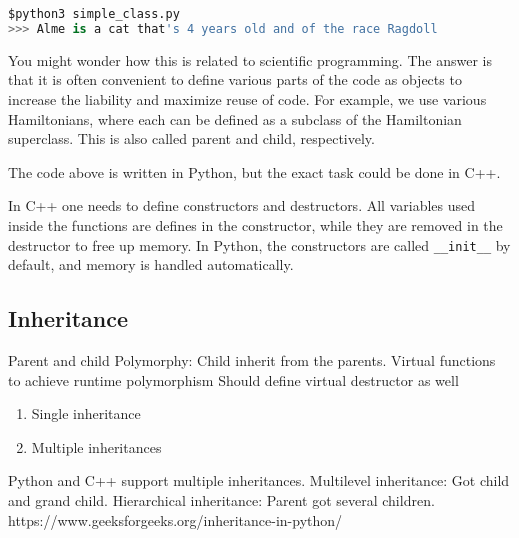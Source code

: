 \lstset{basicstyle=\scriptsize}
\begin{lstlisting}[language=python]
$python3 simple_class.py
>>> Alme is a cat that's 4 years old and of the race Ragdoll
\end{lstlisting}

You might wonder how this is related to scientific programming. The answer is that it is often convenient to define various parts of the code as objects to increase the liability and maximize reuse of code. For example, we use various Hamiltonians, where each can be defined as a subclass of the Hamiltonian superclass. This is also called parent and child, respectively. 

The code above is written in Python, but the exact task could be done in C++. 

In C++ one needs to define constructors and destructors. All variables used inside the functions are defines in the constructor, while they are removed in the destructor to free up memory.  In Python, the constructors are called \texttt{\_\_init\_\_} by default, and memory is handled automatically.

\subsection{Inheritance}
Parent and child
Polymorphy: Child inherit from the parents. 
Virtual functions to achieve runtime polymorphism 
Should define virtual destructor as well 

\begin{enumerate}
	\item Single inheritance
	\item Multiple inheritances
\end{enumerate}

Python and C++ support multiple inheritances. Multilevel inheritance: Got child and grand child. Hierarchical inheritance: Parent got several children. https://www.geeksforgeeks.org/inheritance-in-python/
